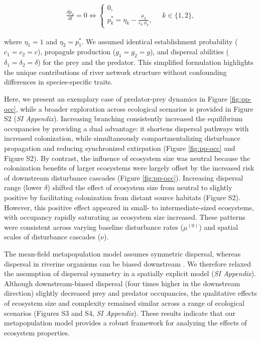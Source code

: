 \documentclass[11pt, class=article, crop=false]{standalone}
\theoremstyle{definition}
\begin{document}
\begin{align}
\frac{dp_k}{dt} = 0 \Leftrightarrow
    \begin{cases}
        0,\\
        p_k^* = \eta_k - \frac{\mu_k}{c_k\,\phi_k},
    \end{cases}
    \quad k \in \{1, 2\},
\end{align}

where $\eta_1 = 1$ and $\eta_2 = p_1^*$.
We assumed identical establishment probability ($c_1 = c_2 = c$), propagule production ($g_1 = g_2 = g$), and dispersal abilities ($\delta_1 = \delta_2 = \delta$) for the prey and the predator.
This simplified formulation highlights the unique contributions of river network structure without confounding differences in species-specific traits.

Here, we present an exemplary case of predator-prey dynamics in Figure \ref{fig:pp-occ}, while a broader exploration across ecological scenarios is provided in Figure S2 (\textit{SI Appendix}). 
Increasing branching consistently increased the equilibrium occupancies by providing a dual advantage: it shortens dispersal pathways with increased colonization, while simultaneously compartmentalizing disturbance propagation and reducing synchronized extirpation (Figure \ref{fig:pp-occ} and Figure S2). 
By contrast, the influence of ecosystem size was neutral because the colonization benefits of larger ecosystems were largely offset by the increased risk of downstream disturbance cascades (Figure \ref{fig:pp-occ}). 
Increasing dispersal range (lower $\delta$) shifted the effect of ecosystem size from neutral to slightly positive by facilitating colonization from distant source habitats (Figure S2). 
However, this positive effect appeared in small- to intermediate-sized ecosystems, with occupancy rapidly saturating as ecosystem size increased.
These patterns were consistent across varying baseline disturbance rates ($\mu^{(0)}$) and spatial scales of disturbance cascades ($\nu$). 

The mean-field metapopulation model assumes symmetric dispersal, whereas dispersal in riverine organisms can be biased downstream \citep[e.g.,][]{terui_asymmetric_2014}. 
We therefore relaxed the assumption of dispersal symmetry in a spatially explicit model (\textit{SI Appendix}). 
Although downstream-biased dispersal (four times higher in the downstream direction) slightly decreased prey and predator occupancies, the qualitative effects of ecosystem size and complexity remained similar across a range of ecological scenarios (Figures S3 and S4, \textit{SI Appendix}). 
These results indicate that our metapopulation model provides a robust framework for analyzing the effects of ecosystem properties.
\end{document}
